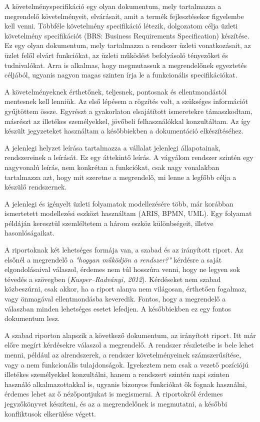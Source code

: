 \documentclass[12pt]{article}
\begin{document}
A követelményspecifikáció egy olyan dokumentum, mely tartalmazza a megrendelő követelményeit, elvárásait, amit a termék fejlesztésekor figyelembe kell venni. Többféle követelmény specifikáció létezik, dolgozatom célja üzleti követelmény specifikációt (BRS: Business Requirements Specification) készítése. Ez  egy olyan dokumentum, mely tartalmazza a rendszer üzleti vonatkozásait, az üzlet felől elvárt funkciókat, az üzleti működést befolyásoló tényezőket és tudnivalókat. Arra is alkalmas, hogy megmutassuk a megrendelőnek egyeztetés céljából, ugyanis nagyon magas szinten írja le a funkcionális specifikációkat.

 A követelményeknek érthetőnek, teljesnek, pontosnak és ellentmondástól mentesnek kell lenniük. Az első lépésem a rögzítés volt, a szükséges információt gyűjtöttem össze. Egyrészt a gyakorlaton elsajátított ismeretekre támaszkodtam, másrészt az illetékes személyekkel, jövőbeli felhasználókkal konzultáltam. Az így készült jegyzeteket használtam a későbbiekben a dokumentáció elkészítéséhez.

A jelenlegi helyzet leírása tartalmazza a vállalat jelenlegi állapotainak, rendszereinek a leírását. Ez egy áttekintő leírás. A vágyálom rendszer szintén egy nagyvonalú leírás, nem konkrétan a funkciókat, csak nagy vonalakban tartalmazza azt, hogy mit szeretne a megrendelő, mi lenne a legfőbb célja a készülő rendszernek.

A jelenlegi és igényelt üzleti folyamatok modellezésére több, már korábban ismertetett modellezési eszközt használtam (ARIS, BPMN, UML). Egy folyamat példáján keresztül szemléltetem a három eszköz különbségeit, illetve hasonlóságaikat. 

A riportoknak két lehetséges formája van, a szabad és az irányított riport. Az elsőnél a megrendelő a \textit{"hogyan működjön a rendszer?"} kérdésre a saját elgondolásaival válaszol, érdemes nem túl hosszúra venni, hogy ne legyen sok tévedés a szövegben (\textit{Kusper–Radványi, 2012}). Kérdéseket nem szabad közbeszúrni, csak akkor, ha a riport alanya nem világosan, érthetően fogalmaz, vagy önmagával ellentmondásba keveredik. Fontos, hogy a megrendelő a válaszban minden lehetséges esetet lefedjen. A későbbiekben ez egy fontos dokumentum lesz. 

A szabad riporton alapszik a következő dokumentum, az irányított riport. Itt már előre megírt kérdésekre válaszol a megrendelő. A rendszer részleteibe is bele lehet menni, például az alrendszerek, a rendszer követelményeinek számszerűsítése, vagy a nem funkcionális tulajdonságok. Igyekeztem nem csak a vezető pozíciójú illetékes személyekkel konzultálni, hanem a rendszert szintén napi szinten használó alkalmazottakkal is, ugyanis bizonyos funkciókat ők fognak használni, érdemes lehet az ő nézőpontjukat is megismerni.
A riportokról érdemes jegyzőkönyvet készíteni, és az a megrendelőnek is megmutatni, a későbbi konfliktusok elkerülése végett.
\end{document}

